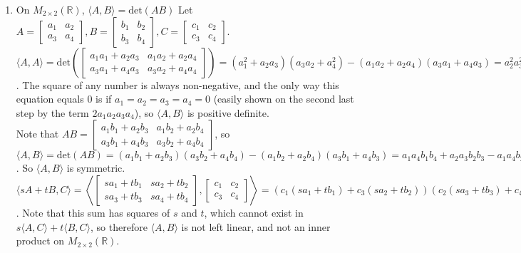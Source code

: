 \documentclass[10pt,english]{article}
\begin{document}
\begin{enumerate}
\begin{enumerate}
    \item On $M_{2\times 2}(\mathbb{R})$, $\langle A,B\rangle=\text{det}(AB)$ Let $A=\begin{bmatrix}a_1&a_2\\a_3&a_4\end{bmatrix},B=\begin{bmatrix}b_1&
    b_2\\b_3&b_4\end{bmatrix},C=\begin{bmatrix}c_1&c_2\\c_3&c_4\end{bmatrix}$. \\ 
    $\langle A,A\rangle=\text{det}\left(\begin{bmatrix}a_1a_1+a_2a_3&a_1a_2+a_2a_4\\a_3a_1+a_4a_3&a_3a_2+a_4a_4\end{bmatrix}\right)=(a_1^2+a_2a_3)(a_3a_2+a_4^2)-(a_1a_2+a_2a_4)(a_3a_1+a_4a_3)=a_2^2a_3^2-2a_1a_2a_3a_4+a_1^2a_4^2=(a_2a_3-a_1a_4)^2$. The square of any number is always non-negative, and the only way this equation equals $0$ is if $a_1=a_2=a_3=a_4=0$ (easily shown on the second last step by the term $2a_1a_2a_3a_4$), so $\langle A,B\rangle$ is positive definite. \\ 
    Note that $AB=\begin{bmatrix}a_1b_1+a_2b_3&a_1b_2+a_2b_4\\a_3b_1+a_4b_3&a_3b_2+a_4b_4\end{bmatrix}$, so $\langle A,B\rangle=\text{det}(AB)=(a_1b_1+a_2b_3)(a_3b_2+a_4b_4)-(a_1b_2+a_2b_4)(a_3b_1+a_4b_3)=a_1a_4b_1b_4+a_2a_3b_2b_3-a_1a_4b_2b_3-a_2a_3b_1b_4=b_1b_4a_1a_4+b_2b_3a_2a_3-b_1b_4a_2a_3-b_2b_3a_1a_4=\text{det}(AB)=\langle A, B\rangle$. So $\langle A,B\rangle$ is symmetric. \\ 
    $\langle sA+tB,C\rangle=\left\langle\begin{bmatrix}sa_1+tb_1&sa_2+tb_2\\sa_3+tb_3&sa_4+tb_4\end{bmatrix},\begin{bmatrix}c_1&c_2\\c_3&c_4\end{bmatrix}\right\rangle=(c_1(sa_1+tb_1)+c_3(sa_2+tb_2))(c_2(sa_3+tb_3)+c_4(sa_4+tb_4))-(c_2(sa_1+tb_1)+c_4(sa_2+tb_2))(c_1(sa_3+tb_3)+c_3(sa_4+tb_4))=a_1a_4c_1c_4s^2+a_2a_3c_2c_3s^2-a_1a_4c_2c_3s^2-a_2a_3c_1c_4s^2+a_1c_1c_4stb_4+a_4c_1c_4stb_1+a_2c_2c_3stb_3+a_3c_2c_3stb_2-a_1c_2c_3stb_4-a_4c_2c_3stb_1-a_2c_1c_4stb_3-a_3c_1c_4stb_2+c_1c_4t^2b_1b_4-c_1c_4t^2b_2b_3+c_2c_3t^2b_2b_3-c_2c_3t^2b_1b_4$. Note that this sum has squares of $s$ and $t$, which cannot exist in $s\langle A,C\rangle+t\langle B,C\rangle$, so therefore $\langle A,B\rangle$ is not left linear, and not an inner product on $M_{2\times2}(\mathbb{R})$. 
    

\end{enumerate}
\end{enumerate}
\end{document}
